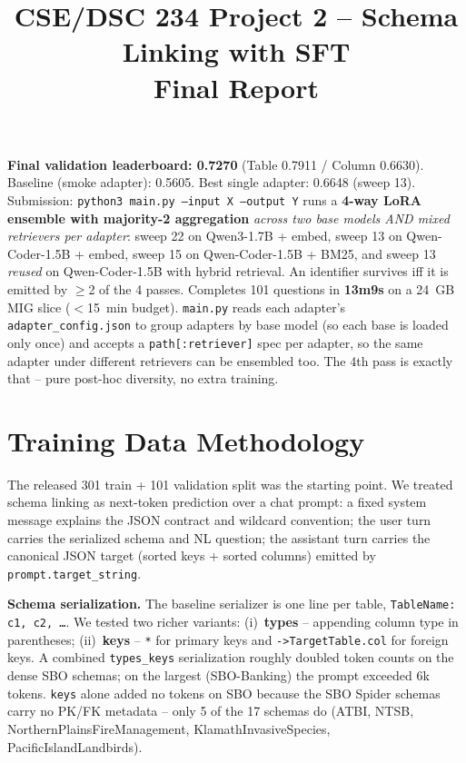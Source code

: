 \documentclass[10pt]{article}
\title{\vspace{-0.6in}\Large CSE/DSC 234 Project 2 -- Schema Linking with SFT\\
\large Final Report}
\author{}
\date{}
\begin{document}
\maketitle\vspace{-0.4in}

\textbf{Final validation leaderboard: 0.7270} (Table 0.7911 / Column 0.6630).
Baseline (smoke adapter): 0.5605. Best single adapter: 0.6648 (sweep 13).
Submission: \texttt{python3 main.py --input X --output Y} runs a \textbf{4-way
LoRA ensemble with majority-2 aggregation} \emph{across two base models AND
mixed retrievers per adapter}: sweep 22 on Qwen3-1.7B + embed, sweep 13 on
Qwen-Coder-1.5B + embed, sweep 15 on Qwen-Coder-1.5B + BM25, and sweep 13
\emph{reused} on Qwen-Coder-1.5B with hybrid retrieval. An identifier
survives iff it is emitted by $\geq$2 of the 4 passes. Completes 101
questions in \textbf{13m9s} on a 24~GB MIG slice ($<$15~min budget).
\texttt{main.py} reads each adapter's \texttt{adapter\_config.json} to group
adapters by base model (so each base is loaded only once) and accepts a
\texttt{path[:retriever]} spec per adapter, so the same adapter under
different retrievers can be ensembled too. The 4th pass is exactly that --
pure post-hoc diversity, no extra training.

\section{Training Data Methodology}

The released 301 train + 101 validation split was the starting point. We treated
schema linking as next-token prediction over a chat prompt: a fixed system message
explains the JSON contract and wildcard convention; the user turn carries the
serialized schema and NL question; the assistant turn carries the canonical JSON
target (sorted keys + sorted columns) emitted by \texttt{prompt.target\_string}.

\textbf{Schema serialization.} The baseline serializer is one line per table,
\texttt{TableName: c1, c2, \dots}. We tested two richer variants:
(i)~\textbf{types} -- appending column type in parentheses; (ii)~\textbf{keys} --
\texttt{*} for primary keys and \texttt{->TargetTable.col} for foreign keys.
A combined \texttt{types\_keys} serialization roughly doubled token counts on the
dense SBO schemas; on the largest (SBO-Banking) the prompt exceeded 6k tokens.
\texttt{keys} alone added no tokens on SBO because the SBO Spider schemas carry
no PK/FK metadata -- only 5 of the 17 schemas do (ATBI, NTSB,
NorthernPlainsFireManagement, KlamathInvasiveSpecies, PacificIslandLandbirds).
\end{document}
